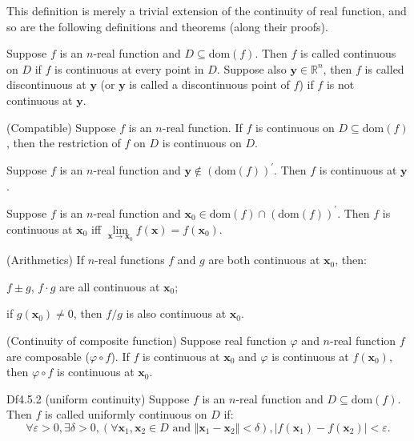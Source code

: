 \documentclass{article}
\begin{document}
\begin{Rmk}{}
    This definition is merely a trivial extension of the continuity of real function, and so are the following definitions and theorems (along their proofs).
    \begin{compactenum}
        \item \textcolor{Df}{Suppose $f$ is an $n$-real function and $D\subseteq\text{dom}(f)$. Then $f$ is called continuous on $D$ if $f$ is continuous at every point in $D$. Suppose also $\pmb{y}\in\mathbb{R}^n$, then $f$ is called discontinuous at $\pmb{y}$ (or $\pmb{y}$ is called a discontinuous point of $f$) if $f$ is not continuous at $\pmb{y}$.}
        \item \textcolor{Th}{(Compatible) Suppose $f$ is an $n$-real function. If $f$ is continuous on $D\subseteq\text{dom}(f)$, then the restriction of $f$ on $D$ is continuous on $D$.}
        \item \textcolor{Th}{Suppose $f$ is an $n$-real function and $\pmb{y}\notin (\text{dom}(f))^\prime$. Then $f$ is continuous at $\pmb{y}$.}
        \item \textcolor{Th}{Suppose $f$ is an $n$-real function and $\pmb{x}_0\in\text{dom}(f)\cap (\text{dom}(f))^\prime$. Then $f$ is continuous at $\pmb{x}_0$ iff $\lim\limits_{\pmb{x}\to\pmb{x}_0} f(\pmb{x}) = f(\pmb{x}_0)$.}
        \item \textcolor{Th}{(Arithmetics) If $n$-real functions $f$ and $g$ are both continuous at $\pmb{x}_0$, then: 
        \begin{compactenum}
            \item $f\pm g$, $f\cdot g$ are all continuous at $\pmb{x}_0$;
            \item if $g(\pmb{x}_0)\neq 0$, then $f/g$ is also continuous at $\pmb{x}_0$. 
        \end{compactenum}}
        \item \textcolor{Th}{(Continuity of composite function) Suppose real function $\varphi$ and $n$-real function $f$ are composable ($\varphi\circ f$). If $f$ is continuous at $\pmb{x}_0$ and $\varphi$ is continuous at $f(\pmb{x}_0)$, then $\varphi\circ f$ is continuous at $\pmb{x}_0$.}
    \end{compactenum}
\end{Rmk}

\begin{Df}{Df4.5.2 (uniform continuity)}
    Suppose $f$ is an $n$-real function and $D\subseteq\text{dom}(f)$. Then $f$ is called uniformly continuous on $D$ if:
    $$\forall\varepsilon>0, \exists\delta>0, \left(\forall \pmb{x}_1, \pmb{x}_2\in D\text{ and } \Vert\pmb{x}_1-\pmb{x}_2\Vert <\delta\right), |f(\pmb{x}_1)-f(\pmb{x}_2)|<\varepsilon.$$
\end{Df}
\end{document}
